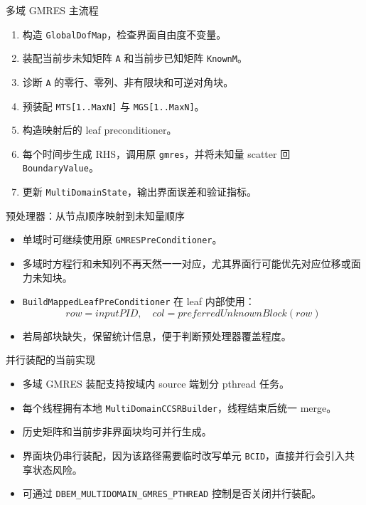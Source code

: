 \documentclass[aspectratio=169,UTF8]{ctexbeamer}
\newcommand{\code}[1]{\texttt{\small #1}}
\begin{document}
\begin{frame}{多域 GMRES 主流程}
  \begin{enumerate}
    \item 构造 \code{GlobalDofMap}，检查界面自由度不变量。
    \item 装配当前步未知矩阵 \code{A} 和当前步已知矩阵 \code{KnownM}。
    \item 诊断 \code{A} 的零行、零列、非有限块和可逆对角块。
    \item 预装配 \code{MTS[1..MaxN]} 与 \code{MGS[1..MaxN]}。
    \item 构造映射后的 leaf preconditioner。
    \item 每个时间步生成 RHS，调用原 \code{gmres}，并将未知量 scatter 回 \code{BoundaryValue}。
    \item 更新 \code{MultiDomainState}，输出界面误差和验证指标。
  \end{enumerate}
\end{frame}

\begin{frame}{预处理器：从节点顺序映射到未知量顺序}
  \begin{itemize}
    \item 单域时可继续使用原 \code{GMRESPreConditioner}。
    \item 多域时方程行和未知列不再天然一一对应，尤其界面行可能优先对应位移或面力未知块。
    \item \code{BuildMappedLeafPreConditioner} 在 leaf 内部使用：
      \[
        row = inputPID,\quad col = preferredUnknownBlock(row)
      \]
    \item 若局部块缺失，保留统计信息，便于判断预处理器覆盖程度。
  \end{itemize}
\end{frame}

\begin{frame}{并行装配的当前实现}
  \begin{itemize}
    \item 多域 GMRES 装配支持按域内 source 端划分 pthread 任务。
    \item 每个线程拥有本地 \code{MultiDomainCCSRBuilder}，线程结束后统一 merge。
    \item 历史矩阵和当前步非界面块均可并行生成。
    \item 界面块仍串行装配，因为该路径需要临时改写单元 \code{BCID}，直接并行会引入共享状态风险。
    \item 可通过 \code{DBEM\_MULTIDOMAIN\_GMRES\_PTHREAD} 控制是否关闭并行装配。
  \end{itemize}
\end{frame}
\end{document}
